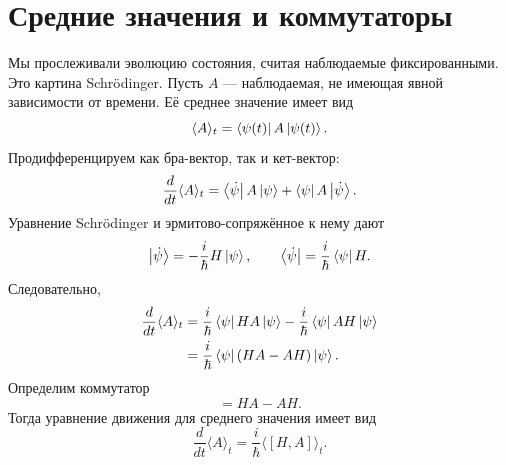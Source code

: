 \begin{classroomqa}
\end{classroomqa}

\section{Средние значения и коммутаторы}

Мы прослеживали эволюцию состояния, считая наблюдаемые фиксированными. Это картина Schr\"odinger. Пусть \(A\) — наблюдаемая, не имеющая явной зависимости от времени. Её среднее значение имеет вид
\begin{equation}
\langle A\rangle_t
=
\left\langle\psi(t)\right\rvert A\left\lvert\psi(t)\right\rangle.
\end{equation}
Продифференцируем как бра-вектор, так и кет-вектор:
\begin{equation}
\frac{d}{dt}\langle A\rangle_t
=
\left\langle\dot\psi\right\rvert A\left\lvert\psi\right\rangle
+
\left\langle\psi\right\rvert A\left\lvert\dot\psi\right\rangle.
\end{equation}
Уравнение Schr\"odinger и эрмитово-сопряжённое к нему дают
\begin{equation}
\left\lvert\dot\psi\right\rangle
=-\frac{i}{\hbar}H\left\lvert\psi\right\rangle,
\qquad
\left\langle\dot\psi\right\rvert
=\frac{i}{\hbar}\left\langle\psi\right\rvert H.
\end{equation}
Следовательно,
\begin{align}
\frac{d}{dt}\langle A\rangle_t
&=
\frac{i}{\hbar}\left\langle\psi\right\rvert HA\left\lvert\psi\right\rangle
-\frac{i}{\hbar}\left\langle\psi\right\rvert AH\left\lvert\psi\right\rangle \\
&=
\frac{i}{\hbar}\left\langle\psi\right\rvert(HA-AH)\left\lvert\psi\right\rangle.
\end{align}
Определим коммутатор
\begin{equation}
[H,A]=HA-AH.
\end{equation}
Тогда уравнение движения для среднего значения имеет вид
\begin{equation}
\boxed{
\frac{d}{dt}\langle A\rangle_t
=
\frac{i}{\hbar}\langle[H,A]\rangle_t
}.
\end{equation}

